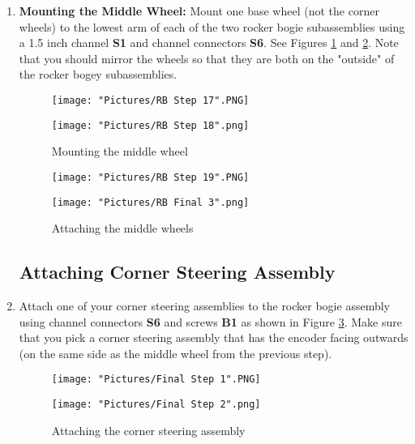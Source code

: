 \documentclass[12pt]{article}
\begin{document}
\begin{enumerate}

\item \textbf{Mounting the Middle Wheel:} Mount one base wheel (not the corner wheels) to the lowest arm of each of the two rocker bogie subassemblies using a 1.5 inch channel \textbf{S1} and channel connectors \textbf{S6}. See Figures \ref{mounting the middle wheel} and \ref{final rocker bogie}.  Note that you should mirror the wheels so that they are both on the "outside" of the rocker bogey subassemblies. 

\begin{figure}[H]
  \centering
  \begin{minipage}[b]{0.45\textwidth}
    \texttt{[image: "Pictures/RB Step 17".PNG]}
  \end{minipage}
  \hfill
  \begin{minipage}[b]{0.45\textwidth}
    \texttt{[image: "Pictures/RB Step 18".png]}
  \end{minipage}
  \caption{Mounting the middle wheel}
  \label{mounting the middle wheel}
\end{figure}

\begin{figure}[H]
  \centering
  \begin{minipage}[b]{0.45\textwidth}
    \texttt{[image: "Pictures/RB Step 19".PNG]}
  \end{minipage}
  \hfill
  \begin{minipage}[b]{0.45\textwidth}
    \texttt{[image: "Pictures/RB Final 3".png]}
  \end{minipage}
  \caption{Attaching the middle wheels}
  \label{final rocker bogie}
\end{figure}


\subsection{Attaching Corner Steering Assembly}

\item Attach one of your corner steering assemblies to the rocker bogie assembly using channel connectors \textbf{S6} and screws \textbf{B1} as shown in Figure \ref{attaching corner wheel}. Make sure that you pick a corner steering assembly that has the encoder facing outwards (on the same side as the middle wheel from the previous step).

\begin{figure}[H]
  \centering
  \begin{minipage}[b]{0.45\textwidth}
    \texttt{[image: "Pictures/Final Step 1".PNG]}
  \end{minipage}
  \hfill
  \begin{minipage}[b]{0.45\textwidth}
    \texttt{[image: "Pictures/Final Step 2".png]}
  \end{minipage}
  \caption{Attaching the corner steering assembly}
  \label{attaching corner wheel}
\end{figure}



\end{enumerate}
\end{document}
